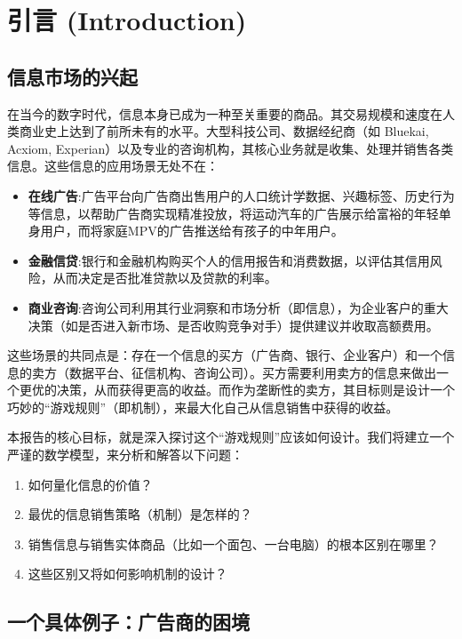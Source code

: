 \section{引言 (Introduction)}

\subsection{信息市场的兴起}

在当今的数字时代，信息本身已成为一种至关重要的商品。其交易规模和速度在人类商业史上达到了前所未有的水平。大型科技公司、数据经纪商（如 Bluekai, Acxiom, Experian）以及专业的咨询机构，其核心业务就是收集、处理并销售各类信息。这些信息的应用场景无处不在：

\begin{itemize}
   \item \textbf{在线广告}:广告平台向广告商出售用户的人口统计学数据、兴趣标签、历史行为等信息，以帮助广告商实现精准投放，将运动汽车的广告展示给富裕的年轻单身用户，而将家庭MPV的广告推送给有孩子的中年用户。
   \item \textbf{金融信贷}:银行和金融机构购买个人的信用报告和消费数据，以评估其信用风险，从而决定是否批准贷款以及贷款的利率。
   \item \textbf{商业咨询}:咨询公司利用其行业洞察和市场分析（即信息），为企业客户的重大决策（如是否进入新市场、是否收购竞争对手）提供建议并收取高额费用。
\end{itemize}

这些场景的共同点是：存在一个信息的买方（广告商、银行、企业客户）和一个信息的卖方（数据平台、征信机构、咨询公司）。买方需要利用卖方的信息来做出一个更优的决策，从而获得更高的收益。而作为垄断性的卖方，其目标则是设计一个巧妙的“游戏规则”（即机制），来最大化自己从信息销售中获得的收益。

本报告的核心目标，就是深入探讨这个“游戏规则”应该如何设计。我们将建立一个严谨的数学模型，来分析和解答以下问题：

\begin{enumerate}
   \item 如何量化信息的价值？
   \item 最优的信息销售策略（机制）是怎样的？
   \item 销售信息与销售实体商品（比如一个面包、一台电脑）的根本区别在哪里？
   \item 这些区别又将如何影响机制的设计？
\end{enumerate}

\subsection{一个具体例子：广告商的困境}

